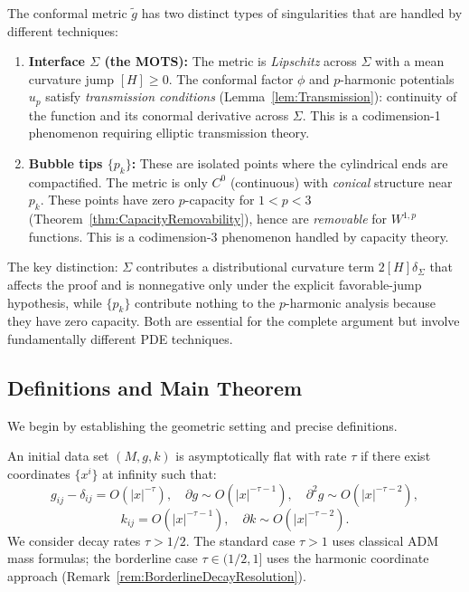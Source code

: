 \begin{remark}\label{rem:TransmissionVsCapacity}
The conformal metric $\tilde{g}$ has two distinct types of singularities that are handled by different techniques:
\begin{enumerate}
    \item \textbf{Interface $\Sigma$ (the MOTS):} The metric is \emph{Lipschitz} across $\Sigma$ with a mean curvature jump $[H] \ge 0$. The conformal factor $\phi$ and $p$-harmonic potentials $u_p$ satisfy \emph{transmission conditions} (Lemma~\ref{lem:Transmission}): continuity of the function and its conormal derivative across $\Sigma$. This is a codimension-1 phenomenon requiring elliptic transmission theory.
    
    \item \textbf{Bubble tips $\{p_k\}$:} These are isolated points where the cylindrical ends are compactified. The metric is only $C^0$ (continuous) with \emph{conical} structure near $p_k$. These points have zero $p$-capacity for $1 < p < 3$ (Theorem~\ref{thm:CapacityRemovability}), hence are \emph{removable} for $W^{1,p}$ functions. This is a codimension-3 phenomenon handled by capacity theory.
\end{enumerate}
The key distinction: $\Sigma$ contributes a distributional curvature term $2[H]\delta_\Sigma$ that affects the proof and is nonnegative only under the explicit favorable-jump hypothesis, while $\{p_k\}$ contribute nothing to the $p$-harmonic analysis because they have zero capacity. Both are essential for the complete argument but involve fundamentally different PDE techniques.
\end{remark}

\subsection{Definitions and Main Theorem}\label{sec:MOTS}

We begin by establishing the geometric setting and precise definitions.

\begin{definition}\label{def:AF}
An initial data set $(M, g, k)$ is asymptotically flat with rate $\tau$ if there exist coordinates $\{x^i\}$ at infinity such that:
\[
    g_{ij} - \delta_{ij} = O(|x|^{-\tau}), \quad \partial g \sim O(|x|^{-\tau-1}), \quad \partial^2 g \sim O(|x|^{-\tau-2}),
\]
\[
    k_{ij} = O(|x|^{-\tau-1}), \quad \partial k \sim O(|x|^{-\tau-2}).
\]
We consider decay rates \textbf{$\tau > 1/2$}. The standard case $\tau > 1$ uses classical ADM mass formulas; the borderline case $\tau \in (1/2, 1]$ uses the harmonic coordinate approach (Remark~\ref{rem:BorderlineDecayResolution}).
\end{definition}

